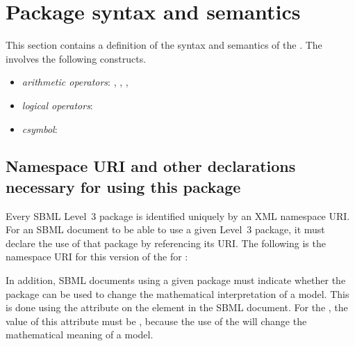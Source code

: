 
\section{Package syntax and semantics}
\label{sec:syntax}

This section contains a definition of the syntax and semantics of the \sbmlthreepkg.  The \ThisPackage involves the following \mathmltwo \cite{w3c:2000b} constructs.


\begin{itemize}\setlength{\parskip}{-0.3ex}

\item \emph{arithmetic operators}: , , , 

\item \emph{logical operators}: 

\item \emph{csymbol}: 

\end{itemize}



\subsection{Namespace URI and other declarations necessary for using this package}
\label{xml-namespace}

Every SBML Level~3 package is identified uniquely by an XML namespace URI.  For an SBML document to be able to use a given Level~3 package, it must declare the use of that package by referencing its URI.  The following is the namespace URI for this version of the \ThisPackage for \sbmlthreecorenoversion:
\begin{center}
\PackageURL
\end{center}

In addition, SBML documents using a given package must indicate whether the package can be used to change the mathematical interpretation of a model.  This is done using the attribute  on the  element in the SBML document.  For the \ThisPackage, the value of this attribute must be , because the use of the \ThisPackage will change the mathematical meaning of a model.

